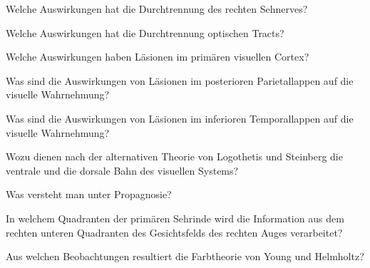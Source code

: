 \documentclass[10pt, a4paper]{exam}
\begin{document}
\begin{questions}
  \question Welche Auswirkungen hat die Durchtrennung des rechten Sehnerves?
  \begin{solution}

  \end{solution}

  \question Welche Auswirkungen hat die Durchtrennung optischen Tracts?
  \begin{solution}

  \end{solution}

  \question Welche Auswirkungen haben Läsionen im primären visuellen Cortex?
  \begin{solution}

  \end{solution}

  \question Was sind die Auswirkungen von Läsionen im posterioren Parietallappen auf die visuelle Wahrnehmung?
  \begin{solution}

  \end{solution}

  \question Was sind die Auswirkungen von Läsionen im inferioren Temporallappen auf die visuelle Wahrnehmung?
  \begin{solution}

  \end{solution}

  \question Wozu dienen nach der alternativen Theorie von Logothetis und Steinberg die ventrale und die dorsale Bahn des visuellen Systems?
  \begin{solution}

  \end{solution}

  \question Was versteht man unter Propagnosie?
  \begin{solution}

  \end{solution}

  \question In welchem Quadranten der primären Sehrinde wird die Information aus dem rechten unteren Quadranten des Gesichtsfelds des rechten Auges verarbeitet?
  \begin{solution}

  \end{solution}

  \question Aus welchen Beobachtungen resultiert die Farbtheorie von Young und Helmholtz?
  \begin{solution}

  \end{solution}


\end{questions}
\end{document}
